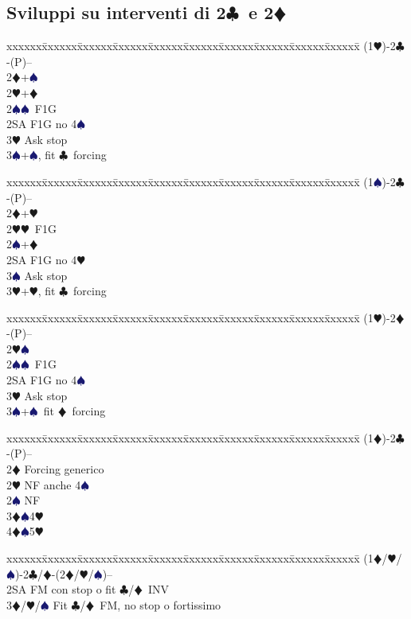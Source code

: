 \documentclass[a4paper,italian]{article}
\newcommand{\BC}{\textcolor{OliveGreen}{$\clubsuit$}}
\newcommand{\BD}{\textcolor{RedOrange}{$\vardiamondsuit$}}
\newcommand{\BH}{\textcolor{Red2}{$\varheartsuit${}}}
\newcommand{\BS}{\textcolor{MidnightBlue}{$\spadesuit${}}}
\newcommand{\pdfc}{\texorpdfstring{\BC{}}{C}}
\newcommand{\pdfd}{\texorpdfstring{\BD{}}{D}}
\newenvironment{bidtable}
{\begin{tabbing}

    xxxxxx\=xxxxxx\=xxxxxx\=xxxxxx\=xxxxxx\=xxxxxx\=xxxxxx\=xxxxxx\=xxxxxx\=xxxxxx\=\kill}
{\end{tabbing} }%
\begin{document}
\begin{multicols}{2}

    \subsection{Sviluppi su interventi di 2\pdfc\ e 2\pdfd}

    \begin{bidtable}
        (1\BH)-2\BC-(P)--\+\\
        2\BD {}+\BS\\
        2\BH {}+\BD \\
        2\BS {}\BS\ F1G\\
        2SA \> F1G no 4\BS\\
        3\BH \> Ask stop\\
        3\BS {}+\BS, fit \BC\ forcing
    \end{bidtable}
    \begin{bidtable}
        (1\BS)-2\BC-(P)--\+\\
        2\BD {}+\BH\\
        2\BH {}\BH\ F1G\\
        2\BS {}+\BD \\
        2SA \> F1G no 4\BH\\
        3\BS \> Ask stop\\
        3\BH {}+\BH, fit \BC\ forcing
    \end{bidtable}

    \begin{bidtable}
        (1\BH)-2\BD-(P)--\+\\
        2\BH {}\BS \\
        2\BS {}\BS\ F1G\\
        2SA \> F1G no 4\BS \\
        3\BH \> Ask stop\\
        3\BS {}+\BS\ fit \BD\ forcing
    \end{bidtable}
    \begin{bidtable}
        (1\BD)-2\BC-(P)--\+\\
        2\BD \> Forcing generico\\
        2\BH \> NF anche 4\BS \\
        2\BS \> NF\\
        3\BD {}\BS 4\BH \\
        4\BD {}\BS 5\BH
    \end{bidtable}
    \begin{bidtable}
        (1\BD/\BH/\BS)-2\BC/\BD-(2\BD/\BH/\BS)--\+\\
        2SA \> FM con stop o fit \BC/\BD\ INV\\
        3\BD/\BH/\BS \> Fit \BC/\BD\ FM, no stop o fortissimo\\
    \end{bidtable}
    \vfill\null
    \columnbreak


\end{multicols}
\end{document}
